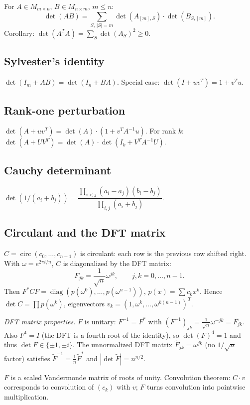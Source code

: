 For $A\in M_{m\times n}$, $B\in M_{n\times m}$, $m\le n$:
$$\det(AB)=\sum_{S,\,|S|=m}\det(A_{[m],S})\cdot\det(B_{S,[m]}).$$
Corollary: $\det(A^TA)=\sum_S\det(A_{S})^2\ge0$.

\subsection{Sylvester's identity}
\label{subsec:sylvester-identity}

$\det(I_m+AB)=\det(I_n+BA)$. Special case: $\det(I+uv^T)=1+v^Tu$.

\subsection{Rank-one perturbation}
\label{subsec:rank-one-perturbation}

$\det(A+uv^T)=\det(A)\cdot(1+v^TA^{-1}u)$. For rank $k$: $\det(A+UV^T)=\det(A)\cdot\det(I_k+V^TA^{-1}U)$.

\subsection{Cauchy determinant}
\label{subsec:cauchy-determinant}

$\det(1/(a_i+b_j))=\dfrac{\prod_{i<j}(a_i-a_j)(b_i-b_j)}{\prod_{i,j}(a_i+b_j)}$.

\subsection{Circulant and the DFT matrix}
\label{subsec:circulant}

$C=\operatorname{circ}(c_0,\dots,c_{n-1})$ is circulant: each row is the previous row shifted right. With $\omega=e^{2\pi i/n}$, $C$ is diagonalized by the DFT matrix:
$$F_{jk}=\frac1{\sqrt n}\omega^{jk},\qquad j,k=0,\dots,n-1.$$
Then $F^*CF=\operatorname{diag}(p(\omega^0),\dots,p(\omega^{n-1}))$, $p(x)=\sum c_k x^k$. Hence $\det C=\prod p(\omega^k)$, eigenvectors $v_k=(1,\omega^k,\dots,\omega^{k(n-1)})^T$.

\textit{DFT matrix properties.} $F$ is unitary: $F^{-1}=F^*$ with $(F^{-1})_{jk}=\frac1{\sqrt n}\omega^{-jk}=\overline{F_{jk}}$.
Also $F^4=I$ (the DFT is a fourth root of the identity), so $\det(F)^4=1$ and thus $\det F\in\{\pm1,\pm i\}$.
The unnormalized DFT matrix $\widetilde F_{jk}=\omega^{jk}$ (no $1/\sqrt n$ factor) satisfies $\widetilde F^{-1}=\frac1n\widetilde F^*$ and $|\det\widetilde F|=n^{n/2}$.

$F$ is a scaled Vandermonde matrix of roots of unity. Convolution theorem: $C\cdot v$ corresponds to convolution of $(c_k)$ with $v$; $F$ turns convolution into pointwise multiplication.


